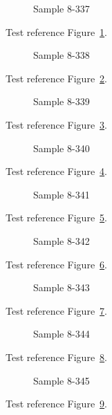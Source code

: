 \begin{figure}[tbhp]
\caption{Sample 8-337}
\label{fig:sample-8-337}
\end{figure}

Test reference Figure~\ref{fig:sample-8-337}.

\begin{figure}[tbhp]
\caption{Sample 8-338}
\label{fig:sample-8-338}
\end{figure}

Test reference Figure~\ref{fig:sample-8-338}.

\begin{figure}[tbhp]
\caption{Sample 8-339}
\label{fig:sample-8-339}
\end{figure}

Test reference Figure~\ref{fig:sample-8-339}.

\begin{figure}[tbhp]
\caption{Sample 8-340}
\label{fig:sample-8-340}
\end{figure}

Test reference Figure~\ref{fig:sample-8-340}.

\begin{figure}[tbhp]
\caption{Sample 8-341}
\label{fig:sample-8-341}
\end{figure}

Test reference Figure~\ref{fig:sample-8-341}.

\begin{figure}[tbhp]
\caption{Sample 8-342}
\label{fig:sample-8-342}
\end{figure}

Test reference Figure~\ref{fig:sample-8-342}.

\begin{figure}[tbhp]
\caption{Sample 8-343}
\label{fig:sample-8-343}
\end{figure}

Test reference Figure~\ref{fig:sample-8-343}.

\begin{figure}[tbhp]
\caption{Sample 8-344}
\label{fig:sample-8-344}
\end{figure}

Test reference Figure~\ref{fig:sample-8-344}.

\begin{figure}[tbhp]
\caption{Sample 8-345}
\label{fig:sample-8-345}
\end{figure}

Test reference Figure~\ref{fig:sample-8-345}.

